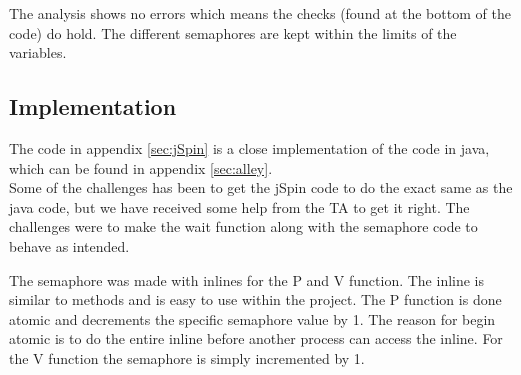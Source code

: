 The analysis shows no errors which means the checks (found at the bottom of the code) do hold. The different semaphores are kept within the limits of the variables. 

\subsection{Implementation}
The code in appendix \ref{sec:jSpin} is a close implementation of the code in java, which can be found in appendix \ref{sec:alley}.
\\

Some of the challenges has been to get the jSpin code to do the exact same as the java code, but we have received some help from the TA to get it right. The challenges were to make the wait function along with the semaphore code to behave as intended. 

The semaphore was made with inlines for the P and V function. The inline is similar to methods and is easy to use within the project. The P function is done atomic and decrements the specific semaphore value by 1. The reason for begin atomic is to do the entire inline before another process can access the inline. For the V function the semaphore is simply incremented by 1.
